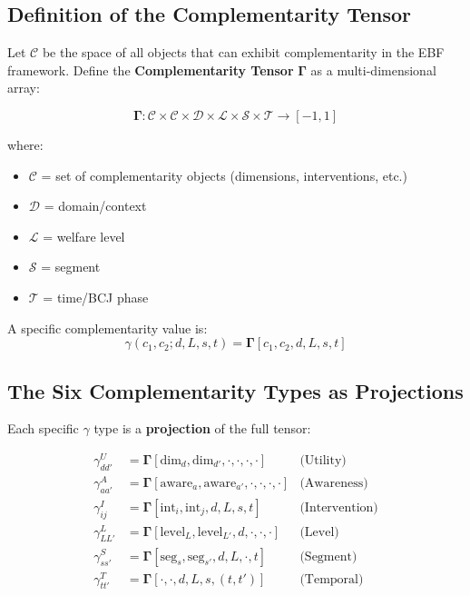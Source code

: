 \subsection{Definition of the Complementarity Tensor}

\begin{definition}
Let $\mathcal{C}$ be the space of all objects that can exhibit complementarity
in the EBF framework. Define the \textbf{Complementarity Tensor} $\boldsymbol{\Gamma}$
as a multi-dimensional array:

\begin{equation}
\boxed{
\boldsymbol{\Gamma} : \mathcal{C} \times \mathcal{C} \times \mathcal{D} \times \mathcal{L} \times \mathcal{S} \times \mathcal{T} \to [-1, 1]
}
\end{equation}

where:
\begin{itemize}[nosep]
    \item $\mathcal{C}$ = set of complementarity objects (dimensions, interventions, etc.)
    \item $\mathcal{D}$ = domain/context
    \item $\mathcal{L}$ = welfare level
    \item $\mathcal{S}$ = segment
    \item $\mathcal{T}$ = time/BCJ phase
\end{itemize}

A specific complementarity value is:
\begin{equation}
\gamma(c_1, c_2; d, L, s, t) = \boldsymbol{\Gamma}[c_1, c_2, d, L, s, t]
\end{equation}
\end{definition}

\subsection{The Six Complementarity Types as Projections}

Each specific $\gamma$ type is a \textbf{projection} of the full tensor:

\begin{align}
\gamma^U_{dd'} &= \boldsymbol{\Gamma}[\text{dim}_d, \text{dim}_{d'}, \cdot, \cdot, \cdot, \cdot]
    & \text{(Utility)} \\
\gamma^A_{aa'} &= \boldsymbol{\Gamma}[\text{aware}_a, \text{aware}_{a'}, \cdot, \cdot, \cdot, \cdot]
    & \text{(Awareness)} \\
\gamma^I_{ij} &= \boldsymbol{\Gamma}[\text{int}_i, \text{int}_j, d, L, s, t]
    & \text{(Intervention)} \\
\gamma^L_{LL'} &= \boldsymbol{\Gamma}[\text{level}_L, \text{level}_{L'}, d, \cdot, \cdot, \cdot]
    & \text{(Level)} \\
\gamma^S_{ss'} &= \boldsymbol{\Gamma}[\text{seg}_s, \text{seg}_{s'}, d, L, \cdot, t]
    & \text{(Segment)} \\
\gamma^T_{tt'} &= \boldsymbol{\Gamma}[\cdot, \cdot, d, L, s, (t, t')]
    & \text{(Temporal)}
\end{align}

